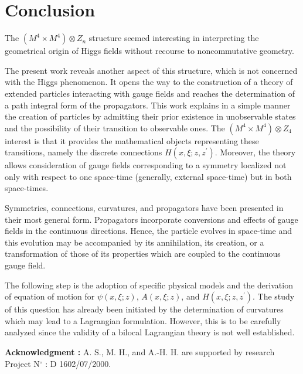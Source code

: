 \documentclass[12pt,a4paper]{article}
\begin{document}
\section{Conclusion}

The $\left(  M^{4}\times M^{4}\right)  \otimes Z_{n}$ structure seemed
interesting in interpreting the geometrical origin of Higgs fields without
recourse to noncommutative geometry.\cite{Konisi 1996,Kubo 1998}

The present work reveals another aspect of this structure, which is not
concerned with the Higgs phenomenon. It opens the way to the construction of a
theory of extended particles interacting with gauge fields and reaches the
determination of a path integral form of the propagators. This work explains
in a simple manner the creation of particles by admitting their prior
existence in unobservable states and the possibility of their transition to
observable ones. The $\left(  M^{4}\times M^{4}\right)  \otimes Z_{4}$
interest is that it provides the mathematical objects representing these
transitions, namely the discrete connections $H\left(  x,\xi;z,z^{\prime
}\right)  $. Moreover, the theory allows consideration of gauge fields
corresponding to a symmetry localized not only with respect to one space-time
(generally, external space-time) but in both space-times.

Symmetries, connections, curvatures, and propagators have been presented in
their most general form. Propagators incorporate conversions and effects of
gauge fields in the continuous directions. Hence, the particle evolves in
space-time and this evolution may be accompanied by its annihilation, its
creation, or a transformation of those of its properties which are coupled to
the continuous gauge field.

The following step is the adoption of specific physical models and the
derivation of equation of motion for $\psi\left(  x,\xi;z\right)  $, $A\left(
x,\xi;z\right)  $, and $H\left(  x,\xi;z,z^{\prime}\right)  $. The study of
this question has already been initiated by the determination of curvatures
which may lead to a Lagrangian formulation. However, this is to be carefully
analyzed since the validity of a bilocal Lagrangian theory is not well established.

\textbf{Acknowledgment :} A. S., M. H., and A.-H. H. are supported by research
Project N${{}^{\circ}}$ : D 1602/07/2000.
\end{document}
